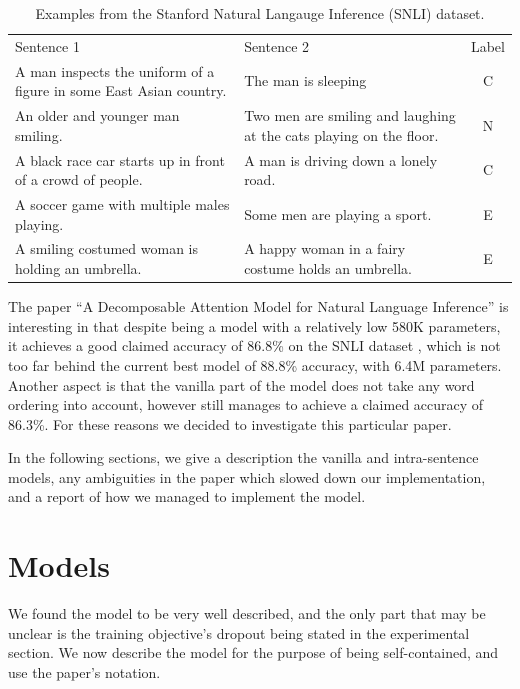 \documentclass{article}
\begin{document}
\begin{table}[htbp]\centering
\setlength\tabcolsep{2pt}
\begin{tabular}{|p{7.5cm}|p{7.5cm}|c|}
    \hline
    Sentence 1 & Sentence 2 & Label \\ \hhline{|===|}
    A man inspects the uniform of a figure in some East Asian country. & The man is sleeping & C \\ \hline
    An older and younger man smiling. & Two men are smiling and laughing at the cats playing on the floor. & N \\ \hline
    A black race car starts up in front of a crowd of people. & A man is driving down a lonely road. & C \\ \hline
    A soccer game with multiple males playing. & Some men are playing a sport. & E \\ \hline
    A smiling costumed woman is holding an umbrella. & A happy woman in a fairy costume holds an umbrella. & E \\ \hline
\end{tabular}
\caption{Examples from the Stanford Natural Langauge Inference (SNLI) dataset.}
\label{table:examples}
\end{table}

The paper ``A Decomposable Attention Model for Natural Language Inference'' \citep{parikh_decomposable_2016} is interesting in that despite being a model with a relatively low 580K parameters, it achieves a good claimed accuracy of 86.8\% on the SNLI dataset \citep{snli:emnlp2015}, which is not too far behind the current best model of 88.8\% accuracy, with 6.4M parameters. Another aspect is that the vanilla part of the model does not take any word ordering into account, however still manages to achieve a claimed accuracy of 86.3\%. For these reasons we decided to investigate this particular paper.

In the following sections, we give a description the vanilla and intra-sentence models, any ambiguities in the paper which slowed down our implementation, and a report of how we managed to implement the model.

\section{Models}
We found the model to be very well described, and the only part that may be unclear is the training objective's dropout being stated in the experimental section. We now describe the model for the purpose of being self-contained, and use the paper's notation.
\end{document}
